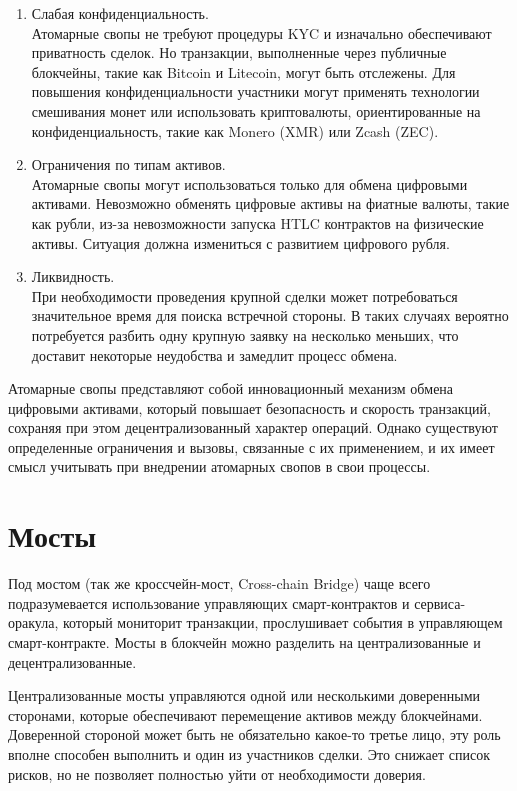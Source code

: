 \begin{enumerate}
\item Слабая конфиденциальность.\\
Атомарные свопы не требуют процедуры KYC и изначально обеспечивают приватность сделок. Но транзакции, выполненные через публичные блокчейны, такие как Bitcoin и Litecoin, могут быть отслежены. Для повышения конфиденциальности участники могут применять технологии смешивания монет или использовать криптовалюты, ориентированные на конфиденциальность, такие как Monero (XMR) или Zcash (ZEC).

\item Ограничения по типам активов.\\
Атомарные свопы могут использоваться только для обмена цифровыми активами. Невозможно обменять цифровые активы на фиатные валюты, такие как рубли, из-за невозможности запуска HTLC контрактов на физические активы. Ситуация должна измениться с развитием цифрового рубля.

\item Ликвидность.\\
При необходимости проведения крупной сделки может потребоваться значительное время для поиска встречной стороны. В таких случаях вероятно потребуется разбить одну крупную заявку на несколько меньших, что доставит некоторые неудобства и замедлит процесс обмена.
\end{enumerate}

Атомарные свопы представляют собой инновационный механизм обмена цифровыми активами, который повышает безопасность и скорость транзакций, сохраняя при этом децентрализованный характер операций. Однако существуют определенные ограничения и вызовы, связанные с их применением, и их имеет смысл учитывать при внедрении атомарных свопов в свои процессы.

\section{Мосты}

Под мостом (так же кроссчейн-мост, Cross-chain Bridge) чаще всего подразумевается использование управляющих смарт-контрактов и сервиса-оракула, который мониторит транзакции, прослушивает события в управляющем смарт-контракте. Мосты в блокчейн можно разделить на централизованные и децентрализованные.

Централизованные мосты управляются одной или несколькими доверенными сторонами, которые обеспечивают перемещение активов между блокчейнами. Доверенной стороной может быть не обязательно какое-то третье лицо, эту роль вполне способен выполнить и один из участников сделки. Это снижает список рисков, но не позволяет полностью уйти от необходимости доверия.

